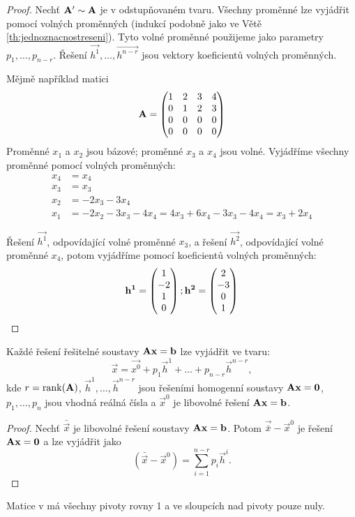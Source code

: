 \begin{proof}
    Nechť $\mathbf{A'} \sim \mathbf{A}$ je v odstupňovaném
    tvaru. Všechny proměnné lze vyjádřit pomocí volných proměnných
    (indukcí podobně jako ve Větě \ref{th:jednoznacnostreseni}). Tyto volné
    proměnné použijeme jako parametry $p_1,\dots,p_{n-r}$. 
    Řešení $\vec{h^1},\dots,\vec{h^{n-r}}$ jsou vektory koeficientů volných
    proměnných.

    Mějmě například matici
    \[ \mathbf{A} = \begin{pmatrix}
            1 &2 &3 &4\\
            0 &1 &2 &3\\ 
            0 &0 &0 &0\\
            0 &0 &0 &0\\
    \end{pmatrix}  \]
    Proměnné $x_1$ a $x_2$ jsou bázové; proměnné $x_3$ a $x_4$ jsou volné.
    Vyjádříme všechny proměnné pomocí volných proměnných:
    \begin{align*}
        x_4 &= x_4 \\
        x_3 &= x_3 \\
        x_2 &=-2x_3 - 3x_4 \\
        x_1 &= -2x_2 - 3x_3 - 4x_4 = 4x_3 + 6x_4 - 3x_3 - 4x_4 = x_3 + 2x_4
    \end{align*}

    Řešení $\vec{h^1}$, odpovídající volné proměnné $x_3$, a řešení
    $\vec{h^2}$, odpovídající volné proměnné $x_4$, potom vyjádříme pomocí
    koeficientů volných proměnných:
    \begin{align*}
        \mathbf{h^1} = \begin{pmatrix}1\\-2\\1\\0\end{pmatrix}; \mathbf{h^2} = \begin{pmatrix}2\\-3\\0\\1\end{pmatrix} 
    \end{align*}

\end{proof}

\begin{corollary}
    Každé řešení řešitelné soustavy $\mathbf{A}\mathbf{x} = \mathbf{b}$ lze vyjádřit
    ve tvaru:
    $$ \vec{x} = \vec{x^0} + p_1\vec{h}^1 + \dots + p_{n-r}\vec{h}^{n-r},$$
    kde $r = \mathop{\mathrm{rank}}(\mathbf{A})$, $\vec{h}^1,\dots,\vec{h}^{n-r}$ jsou řešeními homogenní
    soustavy $\mathbf{A}\mathbf{x} = \mathbf{0}$, $p_1,\dots,p_n$ jsou vhodná
    reálná čísla a $\vec{x}^0$ je libovolné řešení $\mathbf{A}\mathbf{x} =
    \mathbf{b}$.
\end{corollary}

\begin{proof}
    Nechť $\bar{\vec{x}}$ je libovolné řešení soustavy $\mathbf{A}\mathbf{x} =
    \mathbf{b}$. Potom $\vec{\bar{x}} - \vec{x}^0$ je řešení $\mathbf{A}\mathbf{x} =
    \mathbf{0}$ a lze vyjádřit jako
    $$(\bar{\vec{x}} - \vec{x}^0) = \sum_{i=1}^{n-r}{p_i\vec{h}^i}.$$
\end{proof}

\begin{definition}
    Matice v  má všechny pivoty 
    rovny 1 a ve sloupcích nad pivoty pouze nuly.
\end{definition}
